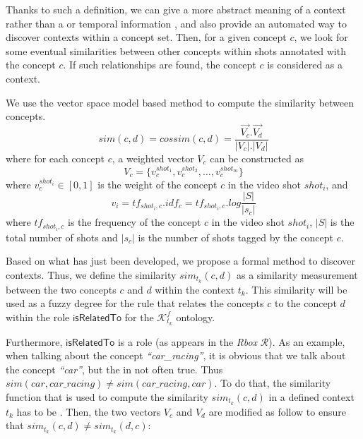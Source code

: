 			Thanks to such a definition, we can give a more abstract meaning of a context rather than a  or 
			temporal information \citep{Brilhault2009}, and also provide an automated way to discover contexts 
			within a concept set.
                	Then, for a given concept $c$, we look for some eventual similarities
			between other concepts within shots annotated with the concept $c$. 
			If such relationships are found, the concept $c$ is considered as a context.

			We use the vector space model based method to compute the similarity between concepts.
			\begin{equation}
				sim(c,d) = cossim(c,d) = \frac{\vec{V_{c}} . 
				\vec{V_{d}}}{|V_{c}| . |V_{d}|}
			\end{equation}
			where for each concept $c$, a weighted vector $V_{c}$ can be constructed as
			\begin{equation}
			V_{c} =\{v^{shot_{1}}_{c},v^{shot_{2}}_{c}, \dots, v^{shot_{m}}_{c}\}
			\end{equation}
			where $v^{shot_{i}}_{c} \in [0,1]$ is the weight of the concept $c$ in the video 
			shot $shot_{i}$, and 
			\begin{equation}
				v_{i}= tf_{shot_{i},c}.idf_{c} = tf_{shot_{i},c}.log\frac{|S|}{|s_{c}|}
			\end{equation}
			where $tf_{shot_{i},c}$ is the frequency of the concept $c$ in the
			video shot $shot_{i}$, $|S|$ is the total number of shots and $|s_{c}|$ is 
			the number of shots tagged by the concept $c$.


			Based on what has just been developed, we propose a formal method to discover contexts. 
			Thus, we define the similarity $sim_{t_{k}}(c, d)$ as a similarity measurement between the 
			two concepts 
			$c$ and $d$ within the context $t_{k}$. This similarity will be used as a fuzzy degree 
			for the rule that relates the concepts $c$ to the concept $d$ within the role 
			$\mathsf{isRelatedTo}$ for the $\mathcal{K}^{f}_{t_{k}}$ ontology.


			Furthermore, $\mathsf{isRelatedTo}$ is a   role
			(as appears in the \emph{Rbox} $\mathcal{R}$). 
			As an example, when talking about the concept \emph{``car\_racing''}, 
			it is obvious that we talk about the concept \emph{``car''}, but  the 
			in not often true. Thus $sim(car,car\_racing) \neq sim(car\_racing ,car)$.
			To do that, the similarity function that is used to compute the similarity $sim_{t_{k}}(c, d)$ 
			in a defined context  $t_{k}$ has to be . 
			Then, the two vectors $V_{c}$ and $V_{d}$ are modified as follow to ensure that  
			$sim_{t_{k}}(c, d) \neq sim_{t_{k}}(d, c)$:

